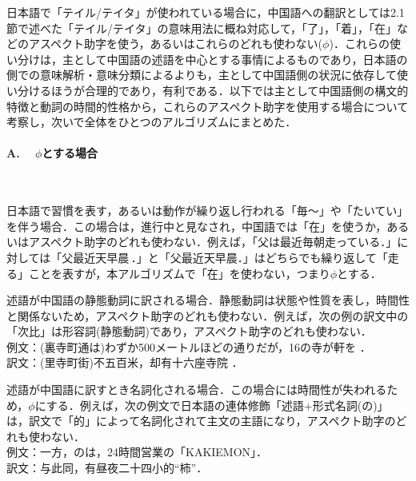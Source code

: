 日本語で「テイル/テイタ」が使われている場合に，中国語への翻訳としては2.1節で述べた「テイル/テイタ」の意味用法に概ね対応して，「了」，「着」，「在」などのアスペクト助字を使う，あるいはこれらのどれも使わない($\phi$)．これらの使い分けは，主として中国語の述語を中心とする事情によるものであり，日本語の側での意味解析・意味分類によるよりも，主として中国語側の状況に依存して使い分けるほうが合理的であり，有利である．以下では主として中国語側の構文的特徴と動詞の時間的性格から，これらのアスペクト助字を使用する場合について考察し，次いで全体をひとつのアルゴリズムにまとめた．

\paragraph{A. 　$\phi$とする場合}　

\begin{enumerater}
\renewcommand{\labelenumi}{}
\renewcommand{\theenumi}{}
\item 日本語で習慣を表す，あるいは動作が繰り返し行われる「毎〜」や「たいてい」を伴う場合．この場合は，進行中と見なされ，中国語では「在」を使うか，あるいはアスペクト助字のどれも使わない．例えば，「父は最近毎朝走っている．」に対しては「父最近天早晨\,．」と「父最近天早晨．」はどちらでも繰り返して「走る」ことを表すが，本アルゴリズムで「在」を使わない，つまり$\phi$とする．
\item 述語が中国語の静態動詞に訳される場合．静態動詞は状態や性質を表し，時間性と関係ないため，アスペクト助字のどれも使わない．例えば，次の例の訳文中の「次比」は形容詞(静態動詞)であり，アスペクト助字のどれも使わない．\\例文：(裏寺町通は)わずか500メートルほどの通りだが，16の寺が軒を ．\\訳文：(里寺町街)不五百米，却有十六座寺院 ．
\item 述語が中国語に訳すとき名詞化される場合．この場合には時間性が失われるため，$\phi$にする．例えば，次の例文で日本語の連体修飾「述語+形式名詞(の)」は，訳文で「的」によって名詞化されて主文の主語になり，アスペクト助字のどれも使わない．\\例文：一方，のは，24時間営業の「KAKIEMON」．\\訳文：与此同，有昼夜二十四小的``柿''．

\end{enumerater}
